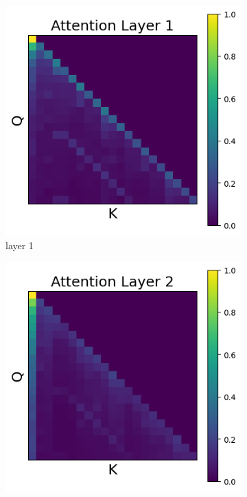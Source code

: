 \documentclass[11pt]{article}
\begin{document}
\subsection{}\label{app:intervention4}
\begin{figure}[t]
  \begin{subfigure}[t]{0.24\textwidth}
    \centering
    \includegraphics[width=1.4\columnwidth]{figures/intervention4/layer_1.png}
    \caption{layer 1}
  \end{subfigure}\hfill
  \begin{subfigure}[t]{0.24\textwidth}
    \centering
    \includegraphics[width=1.4\columnwidth]{figures/intervention4/layer_2.png}

\end{subfigure}
\end{figure}
\end{document}
